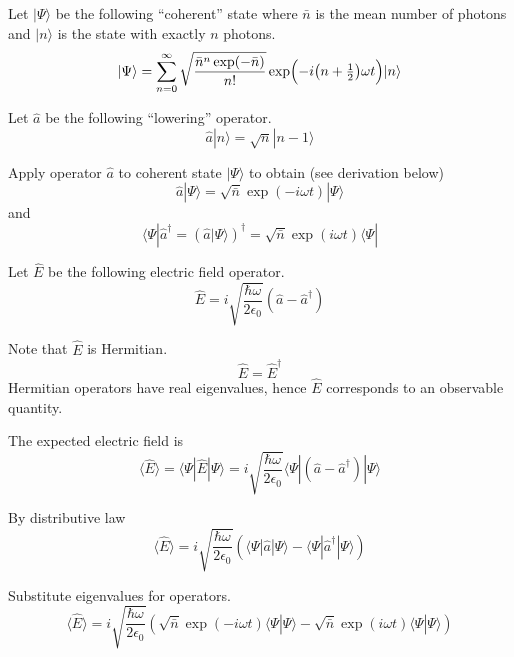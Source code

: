 \documentclass[12pt]{article}
\begin{document}
Let $|\Psi\rangle$ be the following ``coherent'' state where $\bar n$ is the mean number of photons
and $|n\rangle$ is the state with exactly $n$ photons.
\begin{equation*}
|\Psi\rangle=\sum_{n=0}^\infty
\sqrt{\frac{\bar n^n\exp(-\bar n)}{n!}}
\exp\Bigl(-i\bigl(n+\tfrac{1}{2}\bigr)\omega t\Bigr)
|n\rangle
\end{equation*}

Let $\hat a$ be the following ``lowering'' operator.
\begin{equation*}
\hat a|n\rangle=\sqrt n|n-1\rangle
\end{equation*}

Apply operator $\hat a$ to coherent state $|\Psi\rangle$ to obtain (see derivation below)
\begin{equation*}
\hat a|\Psi\rangle=\sqrt{\bar n}\exp(-i\omega t)|\Psi\rangle
\end{equation*}
and
\begin{equation*}
\langle\Psi|\hat a^\dag=\left(\hat a|\Psi\rangle\right)^\dag=\sqrt{\bar n}\exp(i\omega t)\langle\Psi|
\end{equation*}

Let $\hat E$ be the following electric field operator.
\begin{equation*}
\hat E=i\sqrt{\frac{\hbar\omega}{2\epsilon_0}}
(\hat a-\hat a^\dag)
\end{equation*}

Note that $\hat E$ is Hermitian.
\begin{equation*}
\hat E=\hat E^\dag
\end{equation*}
Hermitian operators have real eigenvalues,
hence $\hat E$ corresponds to an observable quantity.

\bigskip
The expected electric field is
\begin{equation*}
\langle\hat E\rangle
=\langle\Psi|\hat E|\Psi\rangle
=i\sqrt{\frac{\hbar\omega}{2\epsilon_0}}
\langle\Psi|(\hat a-\hat a^\dag)|\Psi\rangle
\end{equation*}

By distributive law
\begin{equation*}
\langle\hat E\rangle
=i\sqrt{\frac{\hbar\omega}{2\epsilon_0}}
\left(\langle\Psi|\hat a|\Psi\rangle-\langle\Psi|\hat a^\dag|\Psi\rangle\right)
\end{equation*}

Substitute eigenvalues for operators.
\begin{equation*}
\langle\hat E\rangle
=i\sqrt{\frac{\hbar\omega}{2\epsilon_0}}
\left(\sqrt{\bar n}\exp(-i\omega t)\langle\Psi|\Psi\rangle-\sqrt{\bar n}\exp(i\omega t)\langle\Psi|\Psi\rangle\right)
\end{equation*}
\end{document}
